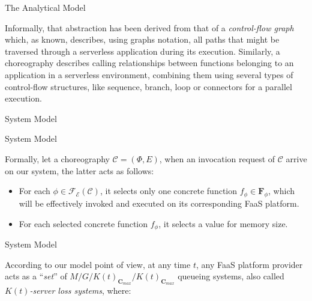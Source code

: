 \documentclass[13.5pt]{beamer}
\begin{document}
\begin{frame}{The Analytical Model}
	
	
	
	
	Informally, that abstraction has been derived from that of a \textit{control-flow graph} which, as known, describes, using graphs notation, all paths that might be traversed through a serverless application during its execution. Similarly, a choreography describes calling relationships between functions belonging to an application in a serverless environment, combining them using several types of control-flow structures, like sequence, branch, loop or connectors for a parallel execution. 
	

	
\end{frame} 
\begin{frame}{System Model}
	
	
	
\end{frame} 
\begin{frame}{System Model}
	
Formally, let a choreography $\mathcal{C} = (\Phi,E)$, when an invocation request of $\mathcal{C}$ arrive on our system, the latter acts as follows:

\begin{itemize}
	\item For each $\phi \in \mathcal{F_E}(\mathcal{C})$, it selects only one concrete function $f_{\phi} \in \textbf{F}_{\phi}$, which will be effectively invoked and executed on its corresponding FaaS platform. 
	\item For each selected concrete function $f_{\phi}$, it selects a value for memory size.
\end{itemize}
	
\end{frame} 
\begin{frame}{System Model}
	
According to our model point of view, at any time $t$, any FaaS platform provider acts as a ``\textit{set}'' of $M/G/K(t)_{\textbf{C}_{max}}/K(t)_{\textbf{C}_{max}}$ queueing systems, also called \textit{$K(t)$-server loss systems}, where:
	
\end{frame}
\end{document}
